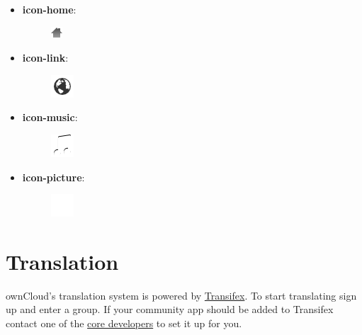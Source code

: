 \documentclass[letterpaper,10pt,english]{sphinxmanual}
\begin{document}
\begin{itemize}
\item {} \begin{description}
\item[{\textbf{icon-home}:}] \leavevmode
\includegraphics{home.png}

\end{description}

\item {} \begin{description}
\item[{\textbf{icon-link}:}] \leavevmode
\includegraphics{link.png}

\end{description}

\item {} \begin{description}
\item[{\textbf{icon-music}:}] \leavevmode
\includegraphics{music.png}

\end{description}

\item {} \begin{description}
\item[{\textbf{icon-picture}:}] \leavevmode
\includegraphics{picture.png}

\end{description}

\end{itemize}


\section{Translation}
\label{app/l10n:translation}\label{app/l10n::doc}
ownCloud's translation system is powered by \href{https://www.transifex.com/projects/p/owncloud/}{Transifex}. To start translating sign up and enter a group. If your community app should be added to Transifex contact one of the \href{https://owncloud.org/contact/}{core developers} to set it up for you.
\end{document}
